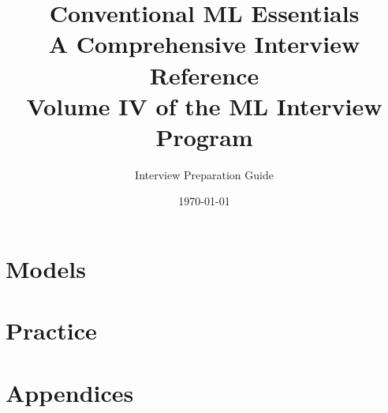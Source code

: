 \documentclass[11pt,twoside]{book}
\title{
    \Huge\textbf{Conventional ML Essentials}\\[0.5cm]
    \Large A Comprehensive Interview Reference\\[0.3cm]
    \large Volume IV of the ML Interview Program
}
\author{Interview Preparation Guide}
\date{\today}
\begin{document}
\frontmatter
\maketitle
\tableofcontents



\mainmatter

\part{Models}





\part{Practice}





\appendix
\part{Appendices}





\backmatter
\end{document}
